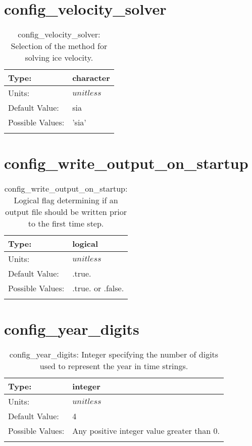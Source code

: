 \section[config\_velocity\_solver]{config\_velocity\_solver}
\label{sec:nm_sec_config_velocity_solver}
\begin{center}
\begin{longtable}{| p{2.0in} || p{4.0in} |}
    \hline
    Type: & character \\
    \hline
    Units: & $unitless$ \\
    \hline
    Default Value: & sia \\
    \hline
    Possible Values: & 'sia' \\
    \hline
    \caption{config\_velocity\_solver: Selection of the method for solving ice velocity.}
\end{longtable}
\end{center}
\section[config\_write\_output\_on\_startup]{config\_write\_output\_on\_startup}
\label{sec:nm_sec_config_write_output_on_startup}
\begin{center}
\begin{longtable}{| p{2.0in} || p{4.0in} |}
    \hline
    Type: & logical \\
    \hline
    Units: & $unitless$ \\
    \hline
    Default Value: & .true. \\
    \hline
    Possible Values: & .true. or .false. \\
    \hline
    \caption{config\_write\_output\_on\_startup: Logical flag determining if an output file should be written prior to the first time step.}
\end{longtable}
\end{center}
\section[config\_year\_digits]{config\_year\_digits}
\label{sec:nm_sec_config_year_digits}
\begin{center}
\begin{longtable}{| p{2.0in} || p{4.0in} |}
    \hline
    Type: & integer \\
    \hline
    Units: & $unitless$ \\
    \hline
    Default Value: & 4 \\
    \hline
    Possible Values: & Any positive integer value greater than 0. \\
    \hline
    \caption{config\_year\_digits: Integer specifying the number of digits used to represent the year in time strings.}
\end{longtable}
\end{center}
